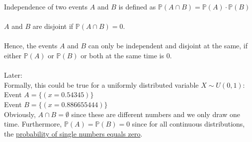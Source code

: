 \documentclass{article}
\begin{document}
\noindent Independence of two events $A$ and $B$ is defined as $\mathbb{P}(A \cap B) = \mathbb{P}(A) \cdot \mathbb{P}(B)$\\
\\
$A$ and $B$ are disjoint if $\mathbb{P}(A \cap B) = 0$.\\
\\
Hence, the events $A$ and $B$ can only be independent and disjoint at the same, if either $\mathbb{P}(A)$ or $\mathbb{P}(B)$ or both at the same time is $0$.\\
\\
Later: \\
Formally, this could be true for a uniformly distributed variable $X \sim U(0,1)$: \\
Event $A = \{(x=0.54345)\}$\\
Event $B = \{(x=0.886655444)\}$\\
Obviously, $A \cap B = \emptyset$ since these are different numbers and we only draw one time.
Furthermore, $\mathbb{P}(A) = \mathbb{P}(B) = 0$ since for all continuous distributions, the \href{https://stats.stackexchange.com/questions/142730/px-x-0-when-x-is-a-continuous-variable}{probability of single numbers equals zero}.
\end{document}
